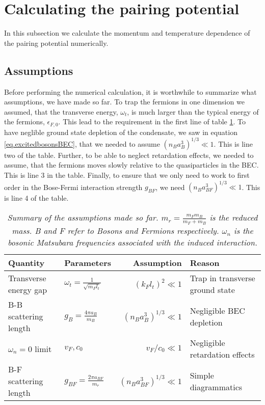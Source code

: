 \section{Calculating the pairing potential} \label{sec.pairingandchemicalpotential.numericalcalculation}
In this subsection we calculate the momentum and temperature dependence of the pairing potential numerically. 

\subsection{Assumptions}
Before performing the numerical calculation, it is worthwhile to summarize what assumptions, we have made so far. To trap the fermions in one dimension we assumed, that the transverse energy, $\omega_t$, is much larger than the typical energy of the fermions, $\epsilon_{F,0}$. This lead to the requirement in the first line of table \ref{tab.assumptions}. To have neglible ground state depletion of the condensate, we saw in equation \eqref{eq.excitedbosonsBEC}, that we needed to assume $(n_Ba_B^3)^{1/3}\ll 1$. This is line two of the table. Further, to be able to neglect retardation effects, we needed to assume, that the fermions moves slowly relative to the quasiparticles in the BEC. This is line 3 in the table. Finally, to ensure that we only need to work to first order in the Bose-Fermi interaction strength $g_{BF}$, we need $(n_Ba_{BF}^3)^{1/3} \ll 1$. This is line 4 of the table. 

\begin{table}[htb]
\def\arraystretch{1.3}
\centering
\caption{\textit{Summary of the assumptions made so far. $m_r = \frac{m_Fm_B}{m_F+m_B}$ is the reduced mass. B and F refer to Bosons and Fermions respectively. $\omega_n$ is the bosonic Matsubara frequencies associated with the induced interaction.}}
\begin{tabular}{|l|l|r|l|}
\hline \textbf{Quantity} & \textbf{Parameters} 						& \textbf{Assumption}						& \textbf{Reason}	\\
\hline Transverse energy gap & $\omega_t = \frac{1}{\sqrt{m_Fl_t}}$ & $(k_Fl_t)^2 	 	\ll 1$ 					& Trap in transverse ground state \\
\hline B-B scattering length & $g_B = \frac{4\pi a_B}{m_B}$			& $(n_Ba_B^3)^{1/3}	\ll 1$					& Negligible BEC depletion  \\
\hline $\omega_n = 0$ limit  & $v_F,c_0$							& $v_F/c_0 \ll 1$ & Negligible retardation effects  \\
\hline B-F scattering length & $g_{BF} = \frac{2\pi a_{BF}}{m_r}$ 	& $(n_Ba_{BF}^3)^{1/3}	\ll 1$				& Simple diagrammatics\\
\hline 
\end{tabular}
\label{tab.assumptions}
\end{table}


